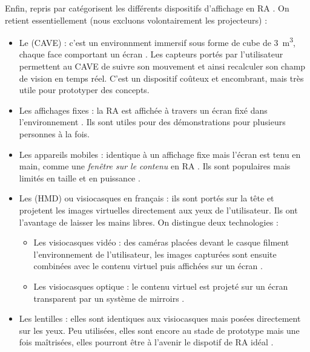 Enfin, \cite{Buxton1998} repris par \cite{Bimber2005} catégorisent les différents dispositifs d'affichage en RA . On retient essentiellement (nous excluons volontairement les projecteurs) :
\begin{itemize}
  \item Le  (CAVE) : c'est un environnment immersif sous forme de cube de \SI{3}{\m^{3}}, chaque face comportant un écran . Les capteurs portés par l'utilisateur permettent au CAVE de suivre son mouvement et ainsi recalculer son champ de vision en temps réel. C'est un dispositif coûteux et encombrant, mais très utile pour prototyper des concepts.
  \item Les affichages fixes : la RA est affichée à travers un écran fixé dans l'environnement . Ils sont utiles pour des démonstrations pour plusieurs personnes à la fois.
  \item Les appareils mobiles : identique à un affichage fixe mais l'écran est tenu en main, comme une \emph{fenêtre sur le contenu} en RA . Ils sont populaires mais limités en taille et en puissance \citep{Huang2013}.
  \item Les  (HMD) ou visiocasques en français : ils sont portés sur la tête et projetent les images virtuelles directement aux yeux de l'utilisateur. Ils ont l'avantage de laisser les mains libres. On distingue deux technologies :
  \begin{itemize}
    \item Les visiocasques vidéo : des caméras placées devant le casque filment l'environnement de l'utilisateur, les images capturées sont ensuite combinées avec le contenu virtuel puis affichées sur un écran .
    \item Les visiocasques optique : le contenu virtuel est projeté sur un écran transparent par un système de mirroirs .
  \end{itemize}
  \item Les lentilles : elles sont identiques aux visiocasques mais posées directement sur les yeux. Peu utilisées, elles sont encore au stade de prototype mais une fois maîtrisées, elles pourront être à l'avenir le dispotif de RA idéal \citep{VanKrevelen2010}.
\end{itemize}


